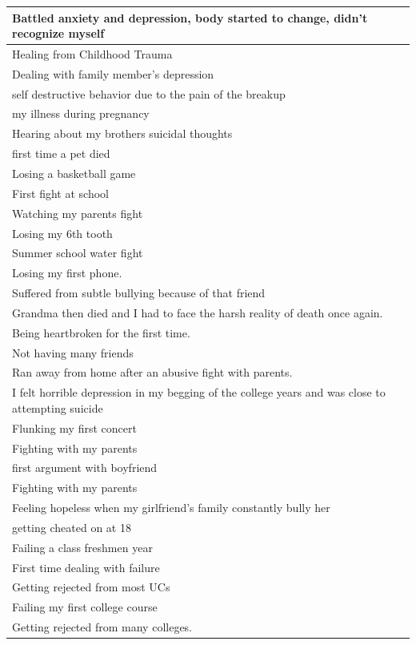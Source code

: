 \documentclass[
  .7em,
  letterpaper,
  DIV=11,
  numbers=noendperiod]{scrartcl}
\begin{document}
\begin{table}
\begin{tabular}{l}
\hline
Battled anxiety and depression, body started to change, didn't recognize myself\\
\hline
Healing from Childhood Trauma\\
\hline
Dealing with family member's depression\\
\hline
self destructive behavior due to the pain of the breakup\\
\hline
my illness during pregnancy\\
\hline
Hearing about my brothers suicidal thoughts\\
\hline
first time a pet died\\
\hline
Losing a basketball game\\
\hline
First fight at school\\
\hline
Watching my parents fight\\
\hline
Losing my 6th tooth\\
\hline
Summer school water fight\\
\hline
Losing my first phone.\\
\hline
Suffered from subtle bullying because of that friend\\
\hline
Grandma then died and I had to face the harsh reality of death once again.\\
\hline
Being heartbroken for the first time.\\
\hline
Not having many friends\\
\hline
Ran away from home after an abusive fight with parents.\\
\hline
I felt horrible depression in my begging of the college years and was close to attempting suicide\\
\hline
Flunking my first concert\\
\hline
Fighting with my parents\\
\hline
first argument with boyfriend\\
\hline
Fighting with my parents\\
\hline
Feeling hopeless when my girlfriend's family constantly bully her\\
\hline
getting cheated on at 18\\
\hline
Failing a class freshmen year\\
\hline
First time dealing with failure\\
\hline
Getting rejected from most UCs\\
\hline
Failing my first college course\\
\hline
Getting rejected from many colleges.\\

\end{tabular}
\end{table}
\end{document}
